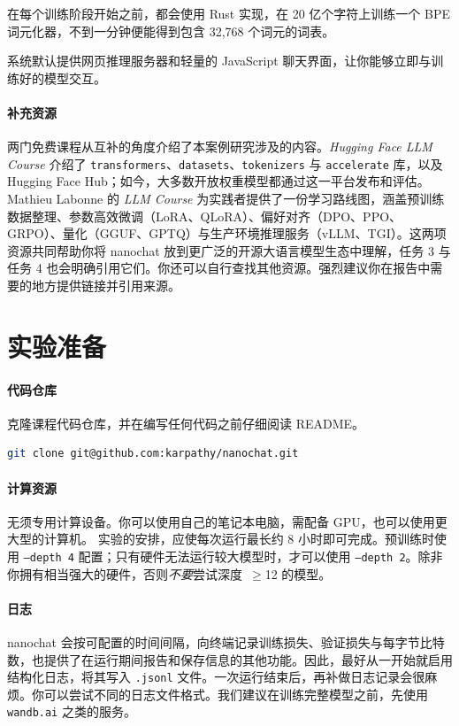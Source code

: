 在每个训练阶段开始之前，都会使用 Rust 实现，在 20 亿个字符上训练一个 BPE 词元化器，不到一分钟便能得到包含 32{,}768 个词元的词表。

系统默认提供网页推理服务器和轻量的 JavaScript 聊天界面，让你能够立即与训练好的模型交互。

\paragraph{补充资源} 两门免费课程从互补的角度介绍了本案例研究涉及的内容。\textit{Hugging Face LLM Course} \citep{huggingface2022course} 介绍了 \texttt{transformers}、\texttt{datasets}、\texttt{tokenizers} 与 \texttt{accelerate} 库，以及 Hugging Face Hub；如今，大多数开放权重模型都通过这一平台发布和评估。Mathieu Labonne 的 \textit{LLM Course} \citep{labonne2023llmcourse} 为实践者提供了一份学习路线图，涵盖预训练数据整理、参数高效微调（LoRA、QLoRA）、偏好对齐（DPO、PPO、GRPO）、量化（GGUF、GPTQ）与生产环境推理服务（vLLM、TGI）。这两项资源共同帮助你将 nanochat 放到更广泛的开源大语言模型生态中理解，任务 3 与任务 4 也会明确引用它们。你还可以自行查找其他资源。强烈建议你在报告中需要的地方提供链接并引用来源。

\section{实验准备}
\label{sec:preparation}

\paragraph{代码仓库} 克隆课程代码仓库，并在编写任何代码之前仔细阅读 README。

\begin{lstlisting}[language=bash, caption={克隆 nanochat 代码仓库}]
git clone git@github.com:karpathy/nanochat.git
\end{lstlisting}

\paragraph{计算资源} 无须专用计算设备。你可以使用自己的笔记本电脑，需配备 GPU，也可以使用更大型的计算机。
实验的安排，应使每次运行最长约 8 小时即可完成。预训练时使用 \texttt{--depth~4} 配置；只有硬件无法运行较大模型时，才可以使用 \texttt{--depth~2}。除非你拥有相当强大的硬件，否则\emph{不要}尝试深度~$\geq$12 的模型。

\paragraph{日志} nanochat 会按可配置的时间间隔，向终端记录训练损失、验证损失与每字节比特数，也提供了在运行期间报告和保存信息的其他功能。因此，最好从一开始就启用结构化日志，将其写入 \texttt{.jsonl} 文件。一次运行结束后，再补做日志记录会很麻烦。你可以尝试不同的日志文件格式。我们建议在训练完整模型之前，先使用 \texttt{wandb.ai} 之类的服务。

